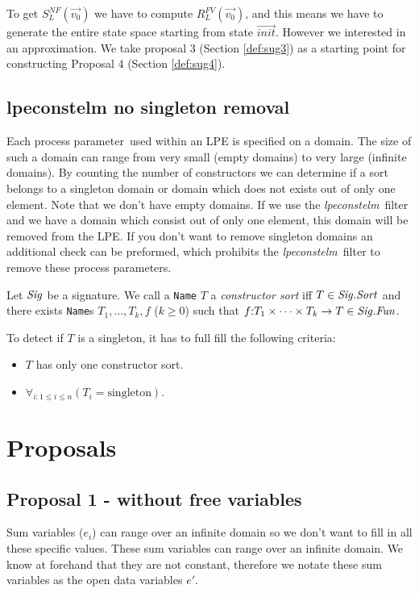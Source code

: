 \index{}\documentclass[a4paper,10pt]{article}
\theoremstyle{plain}
\theoremstyle{definition}
\newcommand{\tool}{\textit{lpeconstelm}}
\newcommand{\ovr}{\overrightarrow}
\newcommand{\pp}{process parameter}
\newcommand{\pps}{process parameters}
\newcommand{\Sig}{\nm{Sig}}
\newcommand{\Sort}{\nm{Sort}}
\newcommand{\Fun}{\nm{Fun}}
\newcommand{\ap}{{:}}
\begin{document}
To get $S_L^{NF} (\ovr{v_0})$ we have to compute $R_L^{FV}(\ovr{v_0})$, and this means we have to generate the entire state space starting from state $\ovr{init}$. However we interested in an approximation. We take proposal 3 (Section \ref{def:sug3}) as a starting point for constructing Proposal 4 (Section \ref{def:sug4}).

\subsection{lpeconstelm no singleton removal}
Each \pp\ used within an LPE is specified on a domain. The size of such a domain can range from very small (empty domains) to very large (infinite domains). By counting the number of constructors we can determine if a sort belongs to a singleton domain or domain which does not exists out of only one element. Note that we don't have empty domains. If we use the \tool\ filter and we have a domain which consist out of only one element, this domain will be removed from the LPE. If you don't want to remove singleton domains an additional check can be preformed, which prohibits the \tool\ filter to remove these \pps .

\begin{defn}
Let $\Sig$ be a signature. We call a {\tt Name} $T$ a {\it constructor sort}
iff $T\in\Sig.\Sort$ and there exists {\tt Name}s $T_1,\ldots, T_k, f$ ($k\geq 0$)
such that $f\ap T_1\times \cdots\times T_k\rightarrow T\in \Sig.\Fun$.
\end{defn}

To detect if $T$ is a singleton, it has to full fill the following criteria:
\begin{itemize}
\item $T$ has only one constructor sort. \\
\item $\forall_{i: 1 \leq i \leq n}(T_{i} = \text{singleton}) $.
\end{itemize}

\section{Proposals}
\subsection{Proposal 1 - without free variables} \label{sec:prop1}
Sum variables ($e_i$) can range over an infinite domain so we don't want to fill in all these specific values. These sum variables can range over an infinite domain. We know at forehand that they are not constant, therefore we notate these sum variables as the open data variables $e'$.
\end{document}
